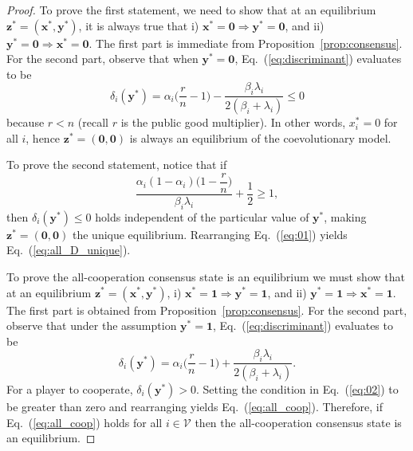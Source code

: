 \documentclass[10pt,a4paper]{amsart}
\renewcommand{\eqref}[1]{Eq.~(\ref{#1})}  %
\newcommand{\vect}[1]{\boldsymbol{#1}}
\begin{document}
\begin{proof}
    To prove the first statement, we need to show that at an equilibrium $\vect z^* = (\vect x^*,\vect y^*)$, it is always true that i) $\vect x^* = \vect 0 \Rightarrow \vect y^* = \vect 0$, and ii) $\vect y^* = \vect 0 \Rightarrow \vect x^* = \vect 0$. The first part is immediate from Proposition~\ref{prop:consensus}. For the second part, observe that when $\vect y^* = \vect 0$, \eqref{eq:discriminant} evaluates to be
    \begin{equation}
        \delta_i(\vect y^*) = \alpha_i\bigg(\frac{r}{n}-1\bigg) - \frac{\beta_i\lambda_i}{2(\beta_i+\lambda_i)} \leq 0
    \end{equation}  
    because $r<n$ (recall $r$ is the public good multiplier). In other words, $x_i^* = 0$ for all $i$, hence $\vect z^* = (\vect 0,\vect 0)$ is always an equilibrium of the coevolutionary model.

    To prove the second statement, notice that if
    \begin{equation}\label{eq:01}
        \dfrac{\alpha_i(1-\alpha_i)\Big(1-\dfrac{r}{n}\Big)}{\beta_i\lambda_i}+\frac{1}{2} \geq1,
    \end{equation}
    then $\delta_i(\vect y^*) \leq 0$ holds independent of the particular value of $\vect y^*$, making $\vect z^*=(\vect 0,\vect 0)$ the unique equilibrium. Rearranging \eqref{eq:01} yields \eqref{eq:all_D_unique}. 

    To prove the all-cooperation consensus state is an equilibrium we must show that at an equilibrium $\vect z^* = (\vect x^*,\vect y^*)$, i) $\vect x^* = \vect 1 \Rightarrow \vect y^* = \vect 1$, and ii) $\vect y^* = \vect 1 \Rightarrow \vect x^* = \vect 1$. The first part is obtained from Proposition~\ref{prop:consensus}. For the second part, observe that under the assumption $\vect y^* = \vect 1$, \eqref{eq:discriminant} evaluates to be
    \begin{equation}\label{eq:02}
        \delta_i(\vect y^*) = \alpha_i\bigg(\frac{r}{n}-1\bigg) + \frac{\beta_i\lambda_i}{2(\beta_i+\lambda_i)}.
    \end{equation} 
    For a player to cooperate, $\delta_i(\vect y^*)>0$. Setting the condition in \eqref{eq:02} to be greater than zero and rearranging yields \eqref{eq:all_coop}. Therefore, if \eqref{eq:all_coop} holds for all $i \in \mathcal{V}$ then the all-cooperation consensus state is an equilibrium. %
\end{proof}
\end{document}
